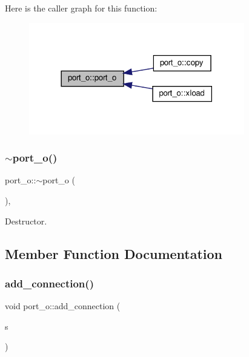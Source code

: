 Here is the caller graph for this function\+:
\nopagebreak
\begin{figure}[H]
\begin{center}
\leavevmode
\includegraphics[width=266pt]{df/d75/structport__o_abdee309e228cb9b4e085ce1a3d5ae41d_icgraph}
\end{center}
\end{figure}
\mbox{\label{structport__o_a1031982b67bfb70af907cb1f793d7e54}} 
\subsubsection{\texorpdfstring{$\sim$port\+\_\+o()}{~port\_o()}}
{\footnotesize\ttfamily port\+\_\+o\+::$\sim$port\+\_\+o (\begin{DoxyParamCaption}{ }\end{DoxyParamCaption})\hspace{0.3cm}{\ttfamily [override]}, {\ttfamily [default]}}



Destructor. 



\subsection{Member Function Documentation}
\mbox{\label{structport__o_a9f9966ea1f2df677fd3985149eb2393e}} 
\subsubsection{\texorpdfstring{add\+\_\+connection()}{add\_connection()}}
{\footnotesize\ttfamily void port\+\_\+o\+::add\+\_\+connection (\begin{DoxyParamCaption}\item[{\hyperlink{structural__objects_8hpp_a8ea5f8cc50ab8f4c31e2751074ff60b2}{structural\+\_\+object\+Ref}}]{s }\end{DoxyParamCaption})}



